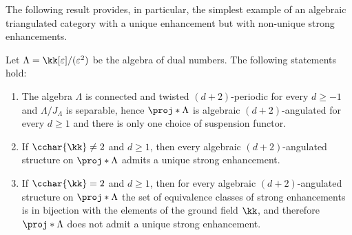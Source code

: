 \documentclass[a4paper]{amsart}
\begin{document}
The following result provides, in particular, the simplest example of an
algebraic triangulated category with a unique enhancement but with non-unique
strong enhancements.

\begin{corollary}
  \label{coro:non_strong_examples}
  Let $\Lambda=\kk[\varepsilon]/(\varepsilon^2)$ be the algebra of dual numbers. The following statements hold:
  \begin{enumerate}
    \item\label{it:dual_num_is_twisted} The algebra $\Lambda$ is connected and twisted $(d+2)$-periodic for every $d\geq -1$ and $\Lambda/J_\Lambda$ is separable, hence $\proj*{\Lambda}$ is algebraic $(d+2)$-angulated for every $d\geq 1$ and there is only one choice of suspension functor.
  \item\label{it:dual_num_char0-strongly_unique} If $\cchar{\kk}\neq 2$ and $d\geq1$, then every algebraic $(d+2)$-angulated structure on
    $\proj*{\Lambda}$ admits a unique strong enhancement.
  \item\label{it:dual_num_char2-non-strongly_unique} If $\cchar{\kk}=2$ and $d\geq1$, then for every algebraic $(d+2)$-angulated structure on
    $\proj*{\Lambda}$ the set of equivalence classes of strong
    enhancements is in bijection with the elements of the ground field $\kk$,
    and therefore $\proj*{\Lambda}$ does not admit a unique strong enhancement.
  \end{enumerate}
\end{corollary}
\end{document}
